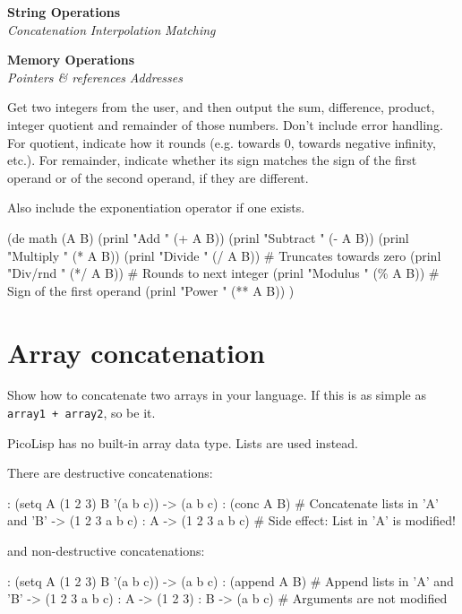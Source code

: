 \textbf{String Operations} \\
\emph{Concatenation} \textbar{}
\emph{Interpolation} \textbar{}
\emph{Matching}

\textbf{Memory Operations} \\
\emph{Pointers \& references}
\textbar{} \emph{Addresses}

Get two integers from the user, and then output the sum, difference,
product, integer quotient and remainder of those numbers. Don't include
error handling. For quotient, indicate how it rounds (e.g. towards 0,
towards negative infinity, etc.). For remainder, indicate whether its
sign matches the sign of the first operand or of the second operand, if
they are different.

Also include the exponentiation operator if one exists.

\begin{wideverbatim}

(de math (A B)
   (prinl "Add      " (+ A B))
   (prinl "Subtract " (- A B))
   (prinl "Multiply " (* A B))
   (prinl "Divide   " (/ A B))        # Truncates towards zero
   (prinl "Div/rnd  " (*/ A B))       # Rounds to next integer
   (prinl "Modulus  " (\% A B))        # Sign of the first operand
   (prinl "Power    " (** A B)) )

\end{wideverbatim}

\pagebreak{}
\section*{Array concatenation}

Show how to concatenate two arrays in your language. If this is as
simple as \texttt{array1 + array2}, so be it.

\begin{wideverbatim}

PicoLisp has no built-in array data type. Lists are used instead.

There are destructive concatenations:

: (setq  A (1 2 3)  B '(a b c))
-> (a b c)
: (conc A B)                        # Concatenate lists in 'A' and 'B'
-> (1 2 3 a b c)
: A
-> (1 2 3 a b c)                    # Side effect: List in 'A' is modified!

and non-destructive concatenations:

: (setq  A (1 2 3)  B '(a b c))
-> (a b c)
: (append A B)                      # Append lists in 'A' and 'B'
-> (1 2 3 a b c)
: A
-> (1 2 3)
: B
-> (a b c)                          # Arguments are not modified

\end{wideverbatim}


